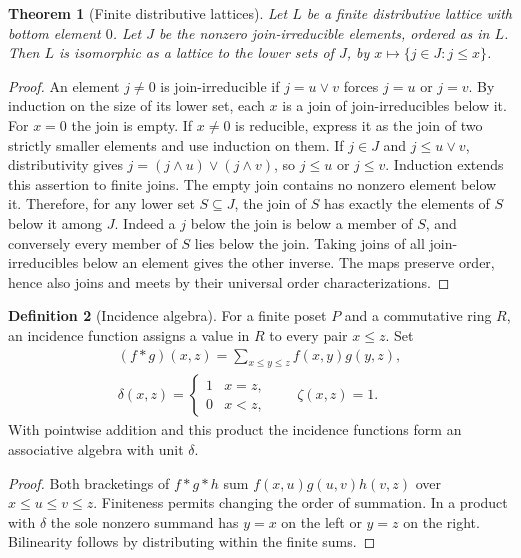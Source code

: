 \documentclass[11pt,oneside,openany]{book}
\theoremstyle{plain}
\newtheorem{theorem}{Theorem}[chapter]
\theoremstyle{definition}
\newtheorem{definition}[theorem]{Definition}
\theoremstyle{remark}
\begin{document}
\begin{theorem}[Finite distributive lattices]\label{p204:W06}
Let \(L\) be a finite distributive lattice with bottom element \(0\).
Let \(J\) be the nonzero join-irreducible elements, ordered as in \(L\).
Then \(L\) is isomorphic as a lattice to the lower sets of \(J\),
by \(x\mapsto\{j\in J:j\le x\}\).
\end{theorem}
\begin{proof}
An element \(j\ne0\) is join-irreducible if \(j=u\vee v\) forces
\(j=u\) or \(j=v\). By induction on the size of its lower set, each
\(x\) is a join of join-irreducibles below it. For \(x=0\) the
join is empty. If \(x\ne0\) is reducible, express it as the join of
two strictly smaller elements and use induction on them.
If \(j\in J\) and \(j\le u\vee v\), distributivity gives
\(j=(j\wedge u)\vee(j\wedge v)\), so \(j\le u\) or \(j\le v\).
Induction extends this assertion to finite joins. The empty join
contains no nonzero element below it. Therefore, for any lower set
\(S\subseteq J\), the join of \(S\) has exactly the elements of \(S\)
below it among \(J\). Indeed a \(j\) below the join is below a member
of \(S\), and conversely every member of \(S\) lies below the join.
Taking joins of all join-irreducibles below an element gives the
other inverse. The maps preserve order, hence also joins and meets
by their universal order characterizations.
\end{proof}

\begin{definition}[Incidence algebra]\label{p204:W07}
For a finite poset \(P\) and a commutative ring \(R\), an incidence
function assigns a value in \(R\) to every pair \(x\le z\).
Set
\begin{gather*}
 (f*g)(x,z)=\sum_{x\le y\le z}f(x,y)g(y,z),
 \\
 \delta(x,z)=
 \begin{cases}1 & x=z,\\0& x<z,\end{cases}
 \qquad
 \zeta(x,z)=1.
\end{gather*}
With pointwise addition and this product the incidence functions form
an associative algebra with unit \(\delta\).
\end{definition}
\begin{proof}
Both bracketings of \(f*g*h\) sum
\(f(x,u)g(u,v)h(v,z)\) over \(x\le u\le v\le z\).
Finiteness permits changing the order of summation. In a product
with \(\delta\) the sole nonzero summand has \(y=x\) on the left or
\(y=z\) on the right. Bilinearity follows by distributing within
the finite sums.
\end{proof}
\end{document}

